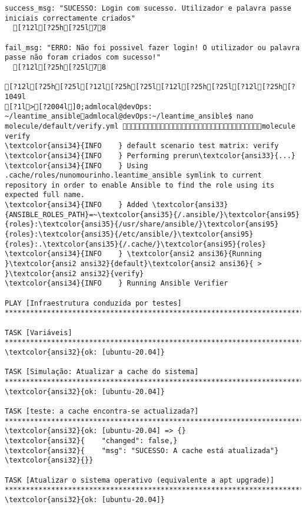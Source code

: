 \documentclass{scrartcl}
\begin{document}
\begin{Verbatim}
success_msg: "SUCESSO: Login com sucesso. Utilizador e palavra passe iniciais correctamente criados"
  [?12l[?25h[?25l78

fail_msg: "ERRO: Não foi possivel fazer login! O utilizador ou palavra passe não foram criados com sucesso!"
  [?12l[?25h[?25l78

[?12l[?25h[?25l[?12l[?25h[?25l[?12l[?25h[?25l[?12l[?25h[?1049l
[?1l>[?2004l]0;admlocal@devOps: ~/leantime_ansibleadmlocal@devOps:~/leantime_ansible$ nano molecule/default/verify.yml molecule verify
\textcolor{ansi34}{INFO    } default scenario test matrix: verify
\textcolor{ansi34}{INFO    } Performing prerun\textcolor{ansi33}{...}
\textcolor{ansi34}{INFO    } Using .cache/roles/nunomourinho.leantime_ansible symlink to current repository in order to enable Ansible to find the role using its expected full name.
\textcolor{ansi34}{INFO    } Added \textcolor{ansi33}{ANSIBLE_ROLES_PATH}=~\textcolor{ansi35}{/.ansible/}\textcolor{ansi95}{roles}:\textcolor{ansi35}{/usr/share/ansible/}\textcolor{ansi95}{roles}:\textcolor{ansi35}{/etc/ansible/}\textcolor{ansi95}{roles}:.\textcolor{ansi35}{/.cache/}\textcolor{ansi95}{roles}
\textcolor{ansi34}{INFO    } \textcolor{ansi2 ansi36}{Running }\textcolor{ansi2 ansi32}{default}\textcolor{ansi2 ansi36}{ > }\textcolor{ansi2 ansi32}{verify}
\textcolor{ansi34}{INFO    } Running Ansible Verifier

PLAY [Infraestrutura conduzida por testes] ***********************************************************************************************

TASK [Variáveis] *************************************************************************************************************************
\textcolor{ansi32}{ok: [ubuntu-20.04]}

TASK [Simulação: Atualizar a cache do sistema] *******************************************************************************************
\textcolor{ansi32}{ok: [ubuntu-20.04]}

TASK [teste: a cache encontra-se actualizada?] *******************************************************************************************
\textcolor{ansi32}{ok: [ubuntu-20.04] => {}
\textcolor{ansi32}{    "changed": false,}
\textcolor{ansi32}{    "msg": "SUCESSO: A cache está atualizada"}
\textcolor{ansi32}{}}

TASK [Atualizar o sistema operativo (equivalente a apt upgrade)] *************************************************************************
\textcolor{ansi32}{ok: [ubuntu-20.04]}


\end{Verbatim}
\end{document}
